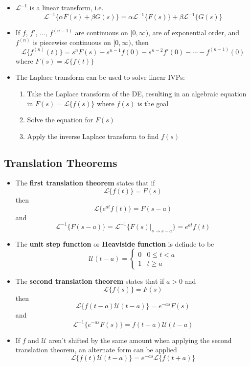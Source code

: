 \documentclass{article}
\begin{document}
\begin{itemize}
  \item $\mathcal{L}^{-1}$ is a linear transform, i.e. \[\mathcal{L}^{-1}\{\alpha F(s) + \beta G(s)\} = \alpha \mathcal{L}^{-1}\{F(s)\} + \beta \mathcal{L}^{-1}\{G(s)\}\]

  \item If $f$, $f'$, $\ldots$, $f^{(n - 1)}$ are continuous on $[0, \infty)$, are of exponential order, and $f^{(n)}$ is piecewise continuous on $[0, \infty)$, then \[\mathcal{L}\{f^{(n)}(t)\} = s^n F(s) - s^{n - 1} f(0) - s^{n - 2} f'(0) - \cdots - f^{(n - 1)}(0)\] where $F(s) = \mathcal{L}\{f(t)\}$

  \item The Laplace transform can be used to solve linear IVPs:

        \begin{enumerate}
          \item Take the Laplace transform of the DE, resulting in an algebraic equation in $F(s) = \mathcal{L}\{f(s)\}$ where $f(s)$ is the goal

          \item Solve the equation for $F(s)$

          \item Apply the inverse Laplace transform to find $f(s)$
        \end{enumerate}
\end{itemize}

\subsection{Translation Theorems}

\begin{itemize}
  \item The \textbf{first translation theorem} states that if \[\mathcal{L}\{f(t)\} = F(s)\] then \[\mathcal{L}\{e^{a t} f(t)\} = F(s - a)\] and \[\mathcal{L}^{-1}\{F(s - a)\} = \mathcal{L}^{-1}\{F(s)|_{s \rightarrow s - a}\} = e^{a t} f(t)\]

  \item The \textbf{unit step function} or \textbf{Heaviside function} is definde to be \[\mathcal{U}(t - a) = \begin{cases}
            0 & 0 \le t < a \\
            1 & t \ge a
          \end{cases}\]

\item The \textbf{second translation theorem} states that if $a > 0$ and \[\mathcal{L}\{f(s)\} = F(s)\] then \[\mathcal{L}\{f(t - a) \mathcal{U}(t - a)\} = e^{-a s} F(s)\] and \[\mathcal{L}^{-1}\{e^{-a s} F(s)\} = f(t - a) \mathcal{U}(t - a)\]

\item If $f$ and $\mathcal{U}$ aren't shifted by the same amount when applying the second translation theorem, an alternate form can be applied \[\mathcal{L}\{f(t) \mathcal{U}(t - a)\} = e^{-a s} \mathcal{L}\{f(t + a)\}\]
\end{itemize}
\end{document}
